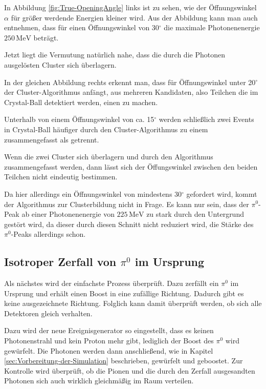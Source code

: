 \documentclass[a4paper,11pt,oneside,final,german,openbib,pdftex]{scrbook}
\begin{document}
{In Abbildung \ref{fig:True-OpeningAngle} links ist zu sehen, wie der \"Offnungswinkel $\alpha$ f\"ur gr\"o{\ss}er werdende Energien kleiner wird. Aus der Abbildung kann man auch entnehmen, dass f\"ur einen \"Offnungswinkel von 30$^{\circ}$ die maximale Photonenenergie $250\,\text{MeV}$ betr\"agt.

Jetzt liegt die Vermutung nat\"urlich nahe, dass die durch die Photonen ausgel\"osten Cluster sich \"uberlagern. 

In der gleichen Abbildung rechts erkennt man, dass f\"ur \"Offnungswinkel unter 20$^{\circ}$ der Cluster-Algorithmus anf\"angt, aus mehreren Kandidaten, also Teilchen die im Crystal-Ball detektiert werden, einen zu machen.

Unterhalb von einem \"Offnungswinkel von ca. 15$^{\circ}$ werden schlie{\ss}lich zwei Events in Crystal-Ball h\"aufiger durch den Cluster-Algorithmus zu einem zusammengefasst als getrennt. 

Wenn die zwei Cluster sich \"uberlagern und durch den Algorithmus zusammengefasst werden, dann l\"asst sich der \"Offungswinkel zwischen den beiden Teilchen nicht eindeutig bestimmen.

Da hier allerdings ein \"Offnungswinkel von mindestens 30$^{\circ}$ gefordert wird, kommt der Algorithmus zur Clusterbildung nicht in Frage.
Es kann nur sein, dass der $\pi^0$-Peak ab einer Photonenenergie von $225\,\text{MeV}$ zu stark durch den Untergrund gest\"ort wird, da dieser durch diesen Schnitt nicht reduziert wird, die St\"arke des $\pi^0$-Peaks allerdings schon.




\subsection{Isotroper Zerfall von $\pi^0$ im Ursprung}
\label{sec:Isotroper-Zerfall-Ursprung}

Als n\"achstes wird der einfachste Prozess \"uberpr\"uft. Dazu zerf\"allt ein $\pi^0$ im Ursprung und erh\"alt einen Boost in eine zufällige Richtung. Dadurch gibt es keine ausgezeichnete Richtung. Folglich kann damit überprüft werden, ob sich alle Detektoren gleich verhalten. 

Dazu wird der neue Ereignisgenerator so eingestellt, dass es keinen Photonenstrahl und kein Proton mehr gibt, lediglich der Boost des $\pi^0$ wird gewürfelt. Die Photonen werden dann anschließend, wie in Kapitel \ref{sec:Vorbereitung-der-Simulation} beschrieben, gewürfelt und geboostet. 
Zur Kontrolle wird \"uberpr\"uft, ob die Pionen und die durch den Zerfall ausgesandten Photonen sich auch wirklich gleichm\"a{\ss}ig im Raum verteilen.


}
\end{document}

